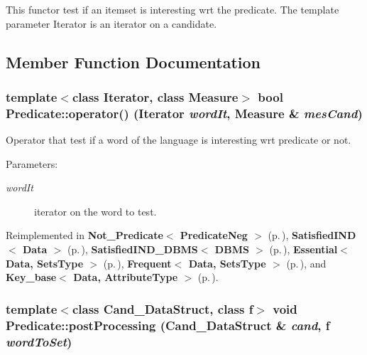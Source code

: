 This functor test if an itemset is interesting wrt the predicate. The template parameter Iterator is an iterator on a candidate. 



\subsection{Member Function Documentation}
\subsubsection{\setlength{\rightskip}{0pt plus 5cm}template$<$class Iterator, class Measure$>$ bool Predicate::operator() (Iterator {\em word\-It}, Measure \& {\em mes\-Cand})\hspace{0.3cm}{\tt  [inline]}}\label{class_predicate_6fb1a75dba2268f75738f335f403e46c}


Operator that test if a word of the language is interesting wrt predicate or not. 

\begin{Desc}
\item[Parameters:]
\begin{description}
\item[{\em word\-It}]iterator on the word to test. \end{description}
\end{Desc}


Reimplemented in {\bf Not\_\-Predicate$<$ Predicate\-Neg $>$} {\rm (p.\,\pageref{class_not___predicate_c4dd938a356c8476e50806158069d169})}, {\bf Satisfied\-IND$<$ Data $>$} {\rm (p.\,\pageref{class_satisfied_i_n_d_bbf69fd5dfbf71f8e7f0685b80551c6d})}, {\bf Satisfied\-IND\_\-DBMS$<$ DBMS $>$} {\rm (p.\,\pageref{class_satisfied_i_n_d___d_b_m_s_10cb098e49804f3de10b20c1d3317814})}, {\bf Essential$<$ Data, Sets\-Type $>$} {\rm (p.\,\pageref{class_essential_e6a89fa2543fe441619066b0f4f6323b})}, {\bf Frequent$<$ Data, Sets\-Type $>$} {\rm (p.\,\pageref{class_frequent_82e02ab1cf1749ea52e9603dc06a5d15})}, and {\bf Key\_\-base$<$ Data, Attribute\-Type $>$} {\rm (p.\,\pageref{class_key__base_27f6933ca653e959cea1332231c1ee8a})}.
\subsubsection{\setlength{\rightskip}{0pt plus 5cm}template$<$class Cand\_\-Data\-Struct, class f$>$ void Predicate::post\-Processing (Cand\_\-Data\-Struct \& {\em cand}, f {\em word\-To\-Set})\hspace{0.3cm}{\tt  [inline]}}\label{class_predicate_49f7acb334fac851a26a4d1aecc64571}


